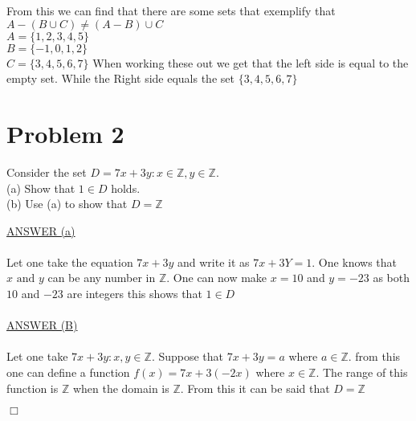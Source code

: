 \documentclass[12pt]{article}
\begin{document}
From this we can find that there are some sets that exemplify that $A-(B\cup C) \neq (A-B)\cup C$\\
$A = \{1,2,3,4,5\}$\\
$B = \{-1,0,1,2\}$\\
$C = \{3,4,5,6,7\}$
When working these out we get that the left side is equal to the empty set. While the Right side equals the set $\{3,4,5,6,7\}$

\section*{Problem 2}\label{Problem 2}
\begin{center}
        Consider the set $D = {7x+3y : x \in \mathbb{Z}, y \in \mathbb{Z}}$. \\
        (a) Show that $1 \in D$ holds.\\
        (b) Use (a) to show that $D = \mathbb{Z}$ \\
\end{center}
\underline{ANSWER (a)}\\
\\Let one take the equation $7x+3y$ and write it as $7x+3Y = 1$.
One knows that $x \text{ and } y$ can be any number in $\mathbb{Z}$.
One can now make $x=10$ and $y=-23$ as both $10$ and $-23$ are integers this shows that $1 \in D$\\
\\\underline{ANSWER (B)}\\
\\ Let one take $7x + 3y : x,y \in \mathbb{Z}$. Suppose that $7x+3y = a$ where $a\in \mathbb{Z}$.
from this one can define a function  $f(x) = 7x+3(-2x)$ where $x \in \mathbb{Z}$.
The range of this function is $\mathbb{Z}$ when the domain is $\mathbb{Z}$.
From this it can be said that $D = \mathbb{Z}$
\begin{flushright}
        $\Box$
\end{flushright}
\end{document}
